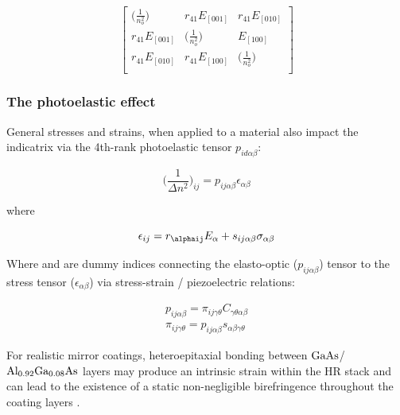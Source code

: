 \begin{equation}
 \left[ {\begin{array}{ccc}
   \big( \frac{1}{n_o ^2} \big)& r_{41}E_{[001]} & r_{41} E_{[010]}\\
   r_{41}E_{[001]} & \big( \frac{1}{n_o ^2} \big) &  E_{[100]}\\
   r_{41} E_{[010]} & r_{41} E_{[100]} & \big( \frac{1}{n_o ^2} \big)\\
  \end{array}} \right]
\end{equation}

\subsubsection{The photoelastic effect}

General stresses and strains, when applied to a material also impact the indicatrix via the 4th-rank photoelastic tensor $p_{id \alpha \beta}$:

\begin{equation}
 \bigg( \frac{1}{\Delta n^2} \bigg)_{ij} = p_{ij\alpha \beta} \epsilon_{\alpha \beta}
\end{equation}

where

\begin{equation}\label{eq:indicgen_stress2strain}
	\epsilon_{ij} = r_{\alphaij}E_{\alpha} + s_{ij \alpha \beta } \sigma_{\alpha \beta}
\end{equation}

Where \alpha and \beta are dummy indices connecting the elasto-optic ($p_{ij \alpha \beta}$) tensor to the stress tensor ($\epsilon_{\alpha \beta}$) via stress-strain / piezoelectric relations:

\begin{equation}\label{eq:indicgen_elasto_optical}
 \begin{split}
	p_{ij \alpha \beta} = \pi_{ij \gamma \theta} C_{\gamma \theta \alpha \beta}
	\\
	\pi_{ij\gamma \theta } = p_{ij \alpha \beta} s_{\alpha \beta \gamma \theta}
 \end{split}
\end{equation}

For realistic mirror coatings, heteroepitaxial bonding between $\mathrm{GaAs}$/$\mathrm{Al_{0.92}Ga_{0.08}As}$ layers may produce an intrinsic strain within the HR stack and can lead to the existence of a static non-negligible birefringence throughout the coating layers \cite{Cole:16}.

